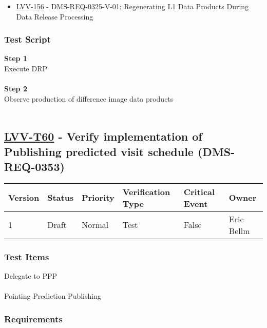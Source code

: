 \begin{itemize}
\tightlist
\item
  \href{https://jira.lsstcorp.org/browse/LVV-156}{LVV-156} -
  DMS-REQ-0325-V-01: Regenerating L1 Data Products During Data Release
  Processing
\end{itemize}

\hypertarget{test-script-36}{%
\subsubsection{Test Script}\label{test-script-36}}

\textbf{Step 1}\\
Execute DRP\\
~\\
\textbf{Step 2}\\
Observe production of difference image data products\\
~\\

\hypertarget{lvv-t60---verify-implementation-of-publishing-predicted-visit-schedule-dms-req-0353}{%
\subsection{\texorpdfstring{\href{https://jira.lsstcorp.org/secure/Tests.jspa\#/testCase/LVV-T60}{LVV-T60}
- Verify implementation of Publishing predicted visit schedule
(DMS-REQ-0353)}{LVV-T60 - Verify implementation of Publishing predicted visit schedule (DMS-REQ-0353)}}\label{lvv-t60---verify-implementation-of-publishing-predicted-visit-schedule-dms-req-0353}}

\begin{longtable}[]{@{}llllll@{}}
\toprule
Version & Status & Priority & Verification Type & Critical Event &
Owner\tabularnewline
\midrule
\endhead
1 & Draft & Normal & Test & False & Eric Bellm\tabularnewline
\bottomrule
\end{longtable}

\hypertarget{test-items-36}{%
\subsubsection{Test Items}\label{test-items-36}}

Delegate to PPP\\
~\\
Pointing Prediction Publishing

\hypertarget{requirements-37}{%
\subsubsection{Requirements}\label{requirements-37}}

